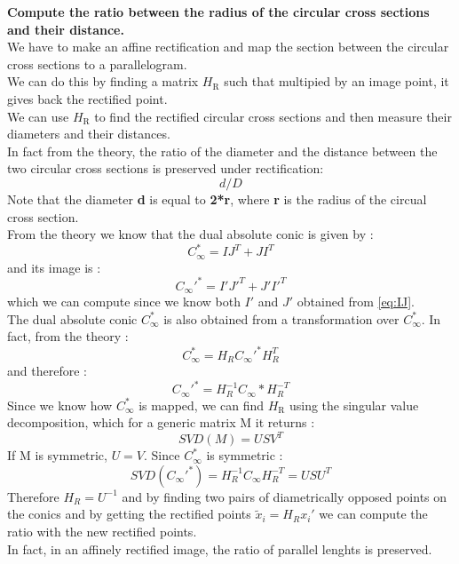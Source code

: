 \documentclass[a4paper, 11pt, oneside, openright, english]{book}
\begin{document}
\textbf{Compute the ratio between the radius of the circular cross sections and their distance.}\\
We have to make an affine rectification and map the section between the circular cross sections to a parallelogram.\\
We can do this by finding a matrix \textbf{$H_{\text{R}}$} such that multipied by an image point, it gives back the rectified point.\\
We can use \textbf{$H_{\text{R}}$} to find the rectified circular cross sections and then measure their diameters and their distances.\\
In fact from the theory, the ratio of the diameter and the distance between the two circular cross sections is preserved under rectification: 
\begin{equation}
    d/D 
\end{equation}
Note that the diameter \textbf{d} is equal to \textbf{2*r},
where \textbf{r} is the radius of the circual cross section.\\
From the theory we know that the dual absolute conic is given by : 
\begin{equation}
    C_\infty^{*} = IJ^{T} + JI^{T}
\end{equation}
and its image is :
\begin{equation}
    C_\infty'^{*} = I'J'^{T} + J'I'^{T}
\end{equation}
which we can compute since we know both \textbf{$I'$} and \textbf{$J'$} obtained from \ref{eq:IJ}.\\
The dual absolute conic \textbf{$C_\infty^*$} is also obtained from a transformation over \textbf{$C_\infty^*$}. In fact, from the theory :
\begin{equation}
    C_\infty^* = H_R C_\infty'^* H_R^{T}
\end{equation}   
and therefore : 
\begin{equation}
    C_\infty'^* = H_R^{-1} C_\infty* H_R^{-T}
\end{equation}
Since we know how \textbf{$C_\infty^*$} is mapped, we can find \textbf{$H_{\text{R}}$} using the singular value decomposition, which for a generic matrix M it returns : 
\begin{equation}
    SVD(M) = USV^T
\end{equation}
If M is symmetric, $U = V$. Since \textbf{$C_\infty^*$} is symmetric : 
\begin{equation}
    SVD(C_\infty'^*) = H_R^{-1} C_\infty H_R^{-T} = USU^T
\end{equation}
Therefore $H_R = U^{-1}$ and by finding two pairs of diametrically opposed points on the conics and by getting the rectified points $\tilde{x} _i = H_R x_i'$ we can compute the ratio with the new rectified points.\\
In fact, in an affinely rectified image, the ratio of parallel lenghts is preserved.
\end{document}
